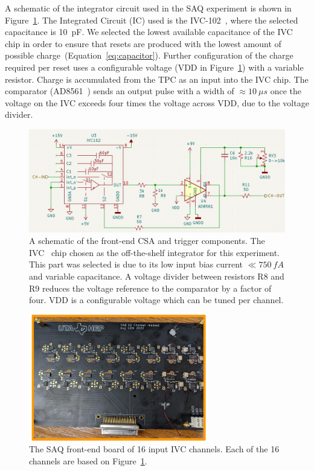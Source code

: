 A schematic of the integrator circuit used in the SAQ experiment is shown in Figure~\ref{fig:saq_circuit_kicad}.
The Integrated Circuit (IC) used is the IVC-102~\citep{ivc_datasheet}, where the selected capacitance is 10~\unit{pF}.
We selected the lowest available capacitance of the IVC chip in order to ensure that resets are produced with the lowest amount of possible charge~(Equation~\ref{eq:capacitor}).
Further configuration of the charge required per reset uses a configurable voltage (VDD in Figure~\ref{fig:saq_circuit_kicad}) with a variable resistor.
Charge is accumulated from the TPC as an input into the IVC chip.
The comparator (AD8561~\citep{AD8561-datasheet}) sends an output pulse with a width of $\approx 10~\unit{\mu s}$ once the voltage on the IVC exceeds four times the voltage across VDD, due to the voltage divider.

\begin{figure}[]
\centering
\includegraphics[width=\textwidth]{images/saq_integrator_circuit.png}
\caption{
A schematic of the front-end CSA and trigger components.
The IVC~\citep{ivc_datasheet} chip chosen as the off-the-shelf integrator for this experiment.
This part was selected is due to its low input bias current $\ll 750~\unit{fA}$ and variable capacitance.
A voltage divider between resistors R8 and R9 reduces the voltage reference to the comparator by a factor of four.
VDD is a configurable voltage which can be tuned per channel.
}
\label{fig:saq_circuit_kicad}
\end{figure}

\begin{figure}[]
\centering
\includegraphics[width=0.7\textwidth]{images/SAQ_16_ivc_readout_board.pdf}
\caption{The SAQ front-end board of 16 input IVC channels.
Each of the 16 channels are based on Figure~\ref{fig:saq_circuit_kicad}.
}
\label{fig:saq_readout_board}
\end{figure}

